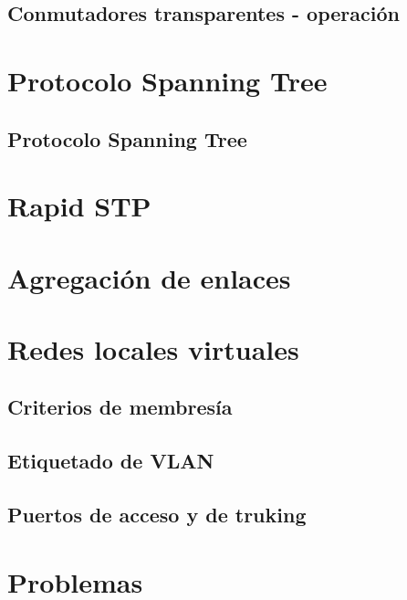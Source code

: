 \documentclass[
]{book}
\begin{document}
\hypertarget{conmutadores-transparentes---operaciuxf3n}{%
\subsection{Conmutadores transparentes - operación}\label{conmutadores-transparentes---operaciuxf3n}}

\hypertarget{protocolo-spanning-tree}{%
\section{Protocolo Spanning Tree}\label{protocolo-spanning-tree}}

\hypertarget{protocolo-spanning-tree-1}{%
\subsection{Protocolo Spanning Tree}\label{protocolo-spanning-tree-1}}

\hypertarget{rapid-stp}{%
\section{Rapid STP}\label{rapid-stp}}

\hypertarget{agregaciuxf3n-de-enlaces}{%
\section{Agregación de enlaces}\label{agregaciuxf3n-de-enlaces}}

\hypertarget{redes-locales-virtuales}{%
\section{Redes locales virtuales}\label{redes-locales-virtuales}}

\hypertarget{criterios-de-membresuxeda}{%
\subsection{Criterios de membresía}\label{criterios-de-membresuxeda}}

\hypertarget{etiquetado-de-vlan}{%
\subsection{Etiquetado de VLAN}\label{etiquetado-de-vlan}}

\hypertarget{puertos-de-acceso-y-de-truking}{%
\subsection{Puertos de acceso y de truking}\label{puertos-de-acceso-y-de-truking}}

\hypertarget{problemas-2}{%
\section{Problemas}\label{problemas-2}}

  
\end{document}

